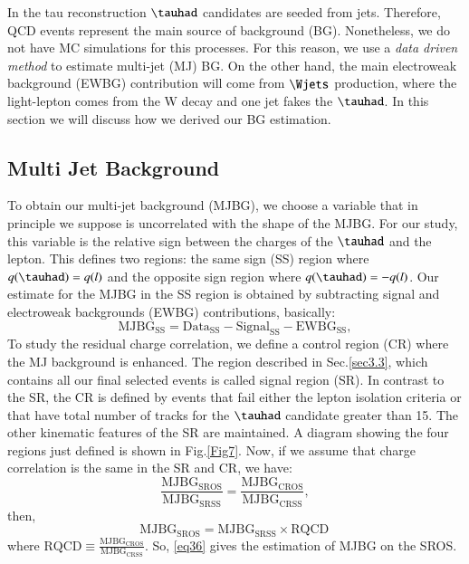 In the tau reconstruction $\tauhad$ candidates are seeded from jets. Therefore, QCD events represent the main source of background (BG). Nonetheless, we do not have MC simulations for this processes. For this reason, we use a \textit{data driven method} to estimate multi-jet (MJ) BG. On the other hand, the main electroweak background (EWBG) contribution will come from $\Wjets$ production, where the light-lepton comes from the W decay and one jet fakes the $\tauhad$. In this section we will discuss how we derived our BG estimation.

\subsection{Multi Jet Background}
To obtain our multi-jet background (MJBG), we choose a variable that in principle we suppose is uncorrelated with the shape of the MJBG. For our study, this variable is the relative sign between the charges of the $\tauhad$ and the lepton. This defines two regions: the same sign (SS) region where $q(\tauhad)=q(l)$ and the opposite sign region where $q(\tauhad)=-q(l)$. Our estimate for the MJBG in the SS region is obtained by subtracting signal and electroweak backgrounds (EWBG) contributions, basically:
\begin{equation}
\text{MJBG}_{\text{SS}}=\text{Data}_{\text{SS}}-\text{Signal}_{\text{SS}}-\text{EWBG}_{\text{SS}},
\end{equation}
 To study the residual charge correlation, we define a control region (CR) where the MJ background is enhanced. The region described in Sec.\ref{sec3.3}, which contains all our final selected events is called signal region (SR). In contrast to the SR, the CR is defined by events that fail either the lepton isolation criteria or that have total number of tracks for the $\tauhad$ candidate greater than 15. The other kinematic features of the SR are maintained. A diagram showing the four regions just defined is shown in Fig.\ref{Fig7}. Now, if we assume that charge correlation is the same in the SR and CR, we have:
 \begin{equation}
 \frac{\text{MJBG}_{\text{SROS}}}{\text{MJBG}_{\text{SRSS}}}=\frac{\text{MJBG}_{\text{CROS}}}{\text{MJBG}_{\text{CRSS}}},
 \end{equation}
then,
 \begin{equation}
\text{MJBG}_{\text{SROS}}=\text{MJBG}_{\text{SRSS}}\times \text{RQCD}\,
\label{eq36}
\end{equation}
where $\text{RQCD}\equiv\frac{\text{MJBG}_{\text{CROS}}}{\text{MJBG}_{\text{CRSS}}}$. So, \eqref{eq36} gives the estimation of MJBG on the SROS.
